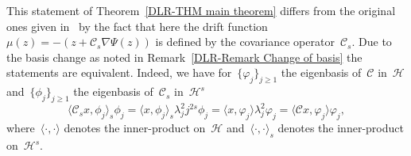 \begin{rem}
  This statement of Theorem~\ref{DLR-THM main theorem} differs from the original ones given in~\autocite[Main Theorem, Theorem 2.6]{Mattingly2010, Pillai2012} by the fact that here the drift function~$\mu (z) = - (z + \mathcal{C}_s \nabla \Psi(z))$ is defined by the covariance operator~$\mathcal{C}_s$. Due to the basis change as noted in Remark~\ref{DLR-Remark Change of basis} the statements are equivalent. Indeed, we have for~$\{ \varphi_j \}_{j \geq 1}$ the eigenbasis of~$\mathcal{C}$ in~$\mathcal{H}$ and~$\{ \phi_j \}_{j \geq 1}$ the eigenbasis of~$\mathcal{C}_s$ in~$\mathcal{H}^s$
  \begin{equation*}
    \langle \mathcal{C}_s x, \phi_j \rangle_s \phi_j = \langle  x, \phi_j \rangle_s \lambda_j^2 j^{2s} \phi_j = \langle  x, \varphi_j \rangle \lambda_j^2  \varphi_j = \langle \mathcal{C} x, \varphi_j \rangle \varphi_j,
  \end{equation*}
  where~$\langle \cdot, \cdot \rangle $ denotes the inner-product on~$\mathcal{H}$ and~$\langle \cdot, \cdot \rangle_s $ denotes the inner-product on~$\mathcal{H}^s$.

\end{rem}



